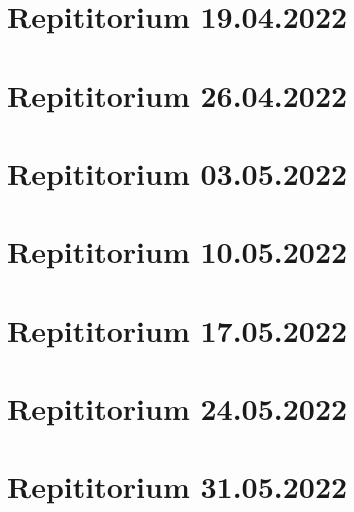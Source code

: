 \documentclass[a4paper,12pt]{article}
\begin{document}
\tableofcontents
\newpage
\section{Repititorium 19.04.2022}

\newpage
\section{Repititorium 26.04.2022}

\newpage
\section{Repititorium 03.05.2022}

\newpage
\section{Repititorium 10.05.2022}

\newpage
\section{Repititorium 17.05.2022}

\newpage
\section{Repititorium 24.05.2022}

\newpage
\section{Repititorium 31.05.2022}
 
\end{document}
